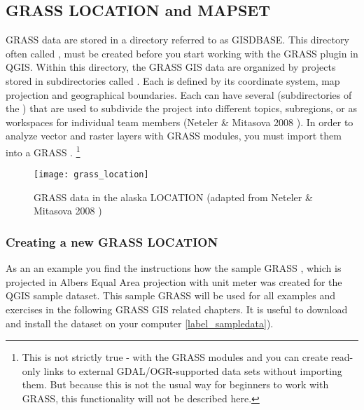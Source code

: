 \subsection{GRASS LOCATION and MAPSET}\label{sec:about_loc}

GRASS data are stored in a directory referred to as GISDBASE. This directory 
often called , must be created before you start working 
with the GRASS plugin in QGIS. Within this directory, the GRASS GIS data 
are organized by projects stored in subdirectories called . 
Each  is defined by its coordinate system, map projection 
and geographical boundaries. Each  can have several 
 (subdirectories of the ) that are used 
to subdivide the project into different topics, subregions, or as workspaces 
for individual team members (Neteler \& Mitasova 2008 
\cite{neteler_mitasova08}). In order to analyze vector and raster layers with 
GRASS modules, you must import them into a GRASS .
\footnote{This is not strictly true - with the GRASS modules 
 and  you can create read-only links 
to external GDAL/OGR-supported data sets without importing them. But because 
this is not the usual way for beginners to work with GRASS, this functionality 
will not be described here.}

\begin{figure}[ht]
\begin{center}
\caption{GRASS data in the alaska LOCATION (adapted from Neteler \& 
Mitasova 2008 \cite{neteler_mitasova08})}\label{fig:grass_location}\smallskip
\texttt{[image: grass\_location]}
\end{center}  
\end{figure}

\subsubsection{Creating a new GRASS LOCATION}\label{sec:create_loc}

As an an example you find the instructions how the sample GRASS
, which is projected in Albers Equal Area
projection with unit meter was created for the QGIS sample dataset. This
sample GRASS  will be used for all examples and
exercises in the following GRASS GIS related chapters. It is useful to
download and install the dataset on your computer \ref{label_sampledata}).

